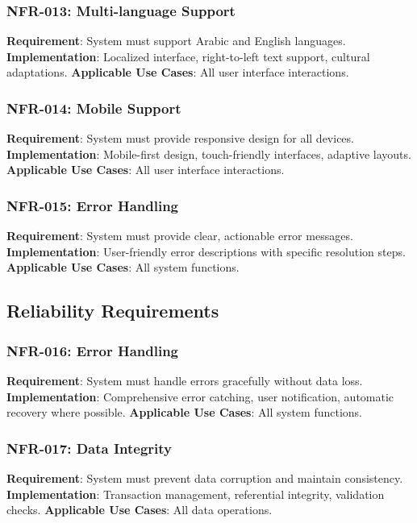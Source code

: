 \documentclass[12pt,a4paper]{article}
\begin{document}
\subsubsection{NFR-013: Multi-language Support}
\textbf{Requirement}: System must support Arabic and English languages.
\textbf{Implementation}: Localized interface, right-to-left text support, cultural adaptations.
\textbf{Applicable Use Cases}: All user interface interactions.

\subsubsection{NFR-014: Mobile Support}
\textbf{Requirement}: System must provide responsive design for all devices.
\textbf{Implementation}: Mobile-first design, touch-friendly interfaces, adaptive layouts.
\textbf{Applicable Use Cases}: All user interface interactions.

\subsubsection{NFR-015: Error Handling}
\textbf{Requirement}: System must provide clear, actionable error messages.
\textbf{Implementation}: User-friendly error descriptions with specific resolution steps.
\textbf{Applicable Use Cases}: All system functions.

\subsection{Reliability Requirements}

\subsubsection{NFR-016: Error Handling}
\textbf{Requirement}: System must handle errors gracefully without data loss.
\textbf{Implementation}: Comprehensive error catching, user notification, automatic recovery where possible.
\textbf{Applicable Use Cases}: All system functions.

\subsubsection{NFR-017: Data Integrity}
\textbf{Requirement}: System must prevent data corruption and maintain consistency.
\textbf{Implementation}: Transaction management, referential integrity, validation checks.
\textbf{Applicable Use Cases}: All data operations.
\end{document}
